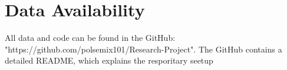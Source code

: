 \chapter{Data Availability}
All data and code can be found in the GitHub: "https://github.com/polsemix101/Research-Project". The GitHub contains a detailed README, which explains the resporitary seetup
